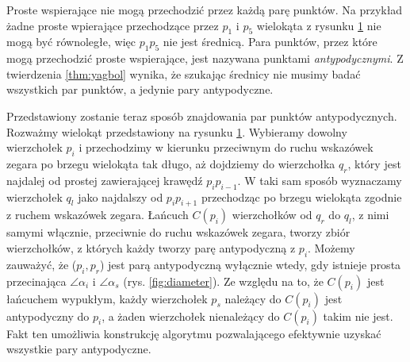 Proste wspierające nie mogą przechodzić przez każdą parę punktów. Na
przykład żadne proste wpierające przechodzące przez $p_1$ i $p_5$
wielokąta z rysunku \ref{fig:antipodal} nie mogą być równoległe, więc
$p_{1}p_{5}$ nie jest średnicą. Para punktów, przez które mogą
przechodzić proste wspierające, jest nazywana punktami
\emph{antypodycznymi}. Z twierdzenia \ref{thm:yagbol} wynika, że
szukając średnicy nie musimy badać wszystkich par punktów, a jedynie
pary antypodyczne.

\begin{figure}[htp]
\centering
\caption{\label{fig:antipodal}}
\end{figure}

Przedstawiony zostanie teraz sposób znajdowania par punktów
antypodycznych. Rozważmy wielokąt przedstawiony na
rysunku \ref{fig:antipodal}. Wybieramy dowolny wierzchołek $p_i$ i
przechodzimy w kierunku przeciwnym do ruchu wskazówek zegara po brzegu
wielokąta tak długo, aż dojdziemy do wierzchołka $q_r$, który jest
najdalej od prostej zawierającej krawędź $p_{i}p_{i-1}$. W taki sam
sposób wyznaczamy wierzchołek $q_l$ jako najdalszy od $p_{i}p_{i+1}$
przechodząc po brzegu wielokąta zgodnie z ruchem wskazówek
zegara. Łańcuch $C(p_i)$ wierzchołków od $q_r$ do $q_l$, z nimi samymi
włącznie, przeciwnie do ruchu wskazówek zegara, tworzy zbiór
wierzchołków, z których każdy tworzy parę antypodyczną z $p_i$. Możemy
zauważyć, że ($p_{i},p_{r}$) jest parą antypodyczną wyłącznie wtedy,
gdy istnieje prosta przecinająca $\angle \alpha_i$ i $\angle \alpha_s$
(rys. \ref{fig:diameter}). Ze względu na to, że $C(p_i)$ jest
łańcuchem wypukłym, każdy wierzchołek $p_s$ należący do $C(p_i)$ jest
antypodyczny do $p_i$, a żaden wierzchołek nienależący do $C(p_i)$
takim nie jest. Fakt ten umożliwia konstrukcję algorytmu pozwalającego
efektywnie uzyskać wszystkie pary antypodyczne.

